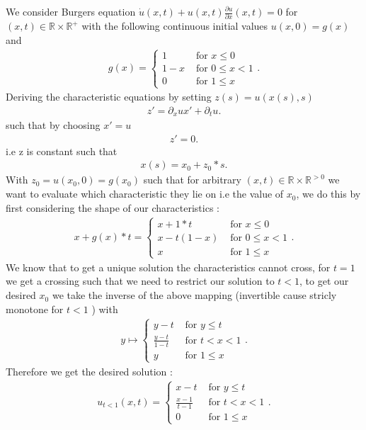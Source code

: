 \begin{solution}
  We consider Burgers equation $\dot{u}(x,t) + u(x,t)\frac{\partial u}{\partial x}(x,t) =0  $  for $(x,t) \in  \mathbb{R} \times  \mathbb{R}^{+} $
  with the following continuous initial values $u(x,0) = g(x)$ and 
  \begin{align*}
    g(x) = \begin{cases}
      1 &\text{ for } x\le 0 \\
      1-x &\text{ for } 0 \le x < 1 \\
      0 &\text{ for } 1 \le x
    \end{cases}
  .\end{align*}
  Deriving the characteristic equations by setting $z(s) = u(x(s),s)$ 
  \begin{align*}
    z' = \partial_x u x' + \partial_t u 
  .\end{align*}
  such that by choosing $x' = u $ 
  \begin{align*}
    z' = 0
  .\end{align*}
  i.e z is constant such that 
  \begin{align*}
    x(s) = x_{0} + z_{0}*s
  .\end{align*}
With $z_0 =u(x_{0},0) = g(x_{0})$ such that for arbitrary $(x,t) \in  \mathbb{R} \times  \mathbb{R}^{>0} $  we want to evaluate which characteristic they lie on 
i.e the value of $x_{0}$, we do this by first considering the shape of our characteristics : 
\begin{align*}
  x+g(x)*t = \begin{cases}
    x+1*t &\text{ for } x\le 0 \\
    x-t(1-x) &\text{ for } 0 \le  x < 1\\
    x &\text{ for } 1\le x
  \end{cases}
.\end{align*}
We know that to get a unique solution the characteristics cannot cross, for $t=1$ we get a crossing such that 
we need to restrict our solution to $t<1$, to get our desired $x_{0}$ we take the inverse of the above mapping (invertible cause stricly monotone for $t<1$ ) with 
\begin{align*}
  y \mapsto \begin{cases}
    y-t &\text{ for } y\le t \\
    \frac{y-t}{1-t} &\text{ for } t <  x < 1\\
    y &\text{ for } 1\le x
  \end{cases}
.\end{align*}
Therefore we get the desired solution :
\begin{align*}
  u_{t<1}(x,t) =  \begin{cases}
    x-t &\text{ for } y\le t \\
    \frac{x-1}{t-1} &\text{ for } t <  x < 1\\
    0 &\text{ for } 1\le x
  \end{cases}
.\end{align*}
\end{solution}
